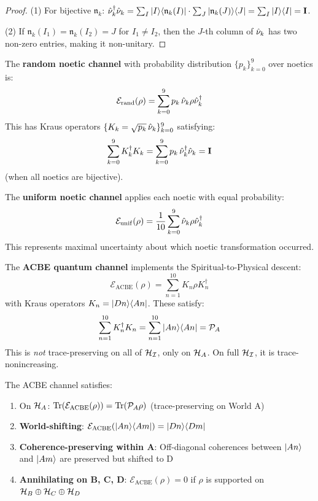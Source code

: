 \begin{proof}
(1) For bijective $\mathfrak{n}_k$: $\hat{\nu}_k^\dagger \hat{\nu}_k = \sum_I |I\rangle\langle \mathfrak{n}_k(I)| \cdot \sum_J |\mathfrak{n}_k(J)\rangle\langle J| = \sum_I |I\rangle\langle I| = \mathbf{I}$.

(2) If $\mathfrak{n}_k(I_1) = \mathfrak{n}_k(I_2) = J$ for $I_1 \neq I_2$, then the $J$-th column of $\hat{\nu}_k$ has two non-zero entries, making it non-unitary.
\end{proof}

\begin{definition}
\label{def:random-noetic-channel}
The \textbf{random noetic channel} with probability distribution $\{p_k\}_{k=0}^{9}$ over noetics is:
\[
\mathcal{E}_{\mathrm{rand}}(\rho) = \sum_{k=0}^{9} p_k \, \hat{\nu}_k \rho \hat{\nu}_k^\dagger
\]
This has Kraus operators $\{K_k = \sqrt{p_k} \, \hat{\nu}_k\}_{k=0}^{9}$ satisfying:
\[
\sum_{k=0}^{9} K_k^\dagger K_k = \sum_{k=0}^{9} p_k \, \hat{\nu}_k^\dagger \hat{\nu}_k = \mathbf{I}
\]
(when all noetics are bijective).
\end{definition}

\begin{example}
\label{ex:uniform-noetic}
The \textbf{uniform noetic channel} applies each noetic with equal probability:
\[
\mathcal{E}_{\mathrm{unif}}(\rho) = \frac{1}{10} \sum_{k=0}^{9} \hat{\nu}_k \rho \hat{\nu}_k^\dagger
\]
This represents maximal uncertainty about which noetic transformation occurred.
\end{example}

\begin{definition}
\label{def:acbe-channel-v73}
The \textbf{ACBE quantum channel} implements the Spiritual-to-Physical descent:
\[
\mathcal{E}_{\mathrm{ACBE}}(\rho) = \sum_{n=1}^{10} K_n \rho K_n^\dagger
\]
with Kraus operators $K_n = |Dn\rangle\langle An|$. These satisfy:
\[
\sum_{n=1}^{10} K_n^\dagger K_n = \sum_{n=1}^{10} |An\rangle\langle An| = \mathcal{P}_A
\]
This is \emph{not} trace-preserving on all of $\mathcal{H}_{\mathcal{I}}$, only on $\mathcal{H}_A$. On full $\mathcal{H}_{\mathcal{I}}$, it is trace-nonincreasing.
\end{definition}

\begin{proposition}
\label{prop:acbe-properties}
The ACBE channel satisfies:
\begin{enumerate}
  \item On $\mathcal{H}_A$: $\mathrm{Tr}(\mathcal{E}_{\mathrm{ACBE}}(\rho)) = \mathrm{Tr}(\mathcal{P}_A \rho)$ (trace-preserving on World A)
  \item \textbf{World-shifting}: $\mathcal{E}_{\mathrm{ACBE}}(|An\rangle\langle Am|) = |Dn\rangle\langle Dm|$
  \item \textbf{Coherence-preserving within A}: Off-diagonal coherences between $|An\rangle$ and $|Am\rangle$ are preserved but shifted to D
  \item \textbf{Annihilating on B, C, D}: $\mathcal{E}_{\mathrm{ACBE}}(\rho) = 0$ if $\rho$ is supported on $\mathcal{H}_B \oplus \mathcal{H}_C \oplus \mathcal{H}_D$
\end{enumerate}
\end{proposition}

